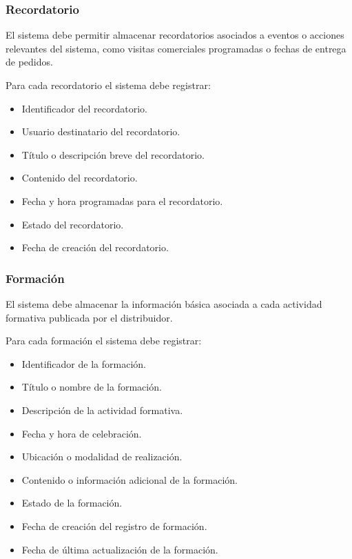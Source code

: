 \subsubsection*{Recordatorio}

El sistema debe permitir almacenar recordatorios asociados a eventos o acciones relevantes del sistema, como visitas comerciales programadas o fechas de entrega de pedidos.

Para cada recordatorio el sistema debe registrar:

\begin{itemize}
    \item Identificador del recordatorio.
    \item Usuario destinatario del recordatorio.
    \item Título o descripción breve del recordatorio.
    \item Contenido del recordatorio.
    \item Fecha y hora programadas para el recordatorio.
    \item Estado del recordatorio.
    \item Fecha de creación del recordatorio.
\end{itemize}

\subsubsection*{Formación}

El sistema debe almacenar la información básica asociada a cada actividad formativa publicada por el distribuidor.

Para cada formación el sistema debe registrar:

\begin{itemize}
    \item Identificador de la formación.
    \item Título o nombre de la formación.
    \item Descripción de la actividad formativa.
    \item Fecha y hora de celebración.
    \item Ubicación o modalidad de realización.
    \item Contenido o información adicional de la formación.
    \item Estado de la formación.
    \item Fecha de creación del registro de formación.
    \item Fecha de última actualización de la formación.
\end{itemize}

